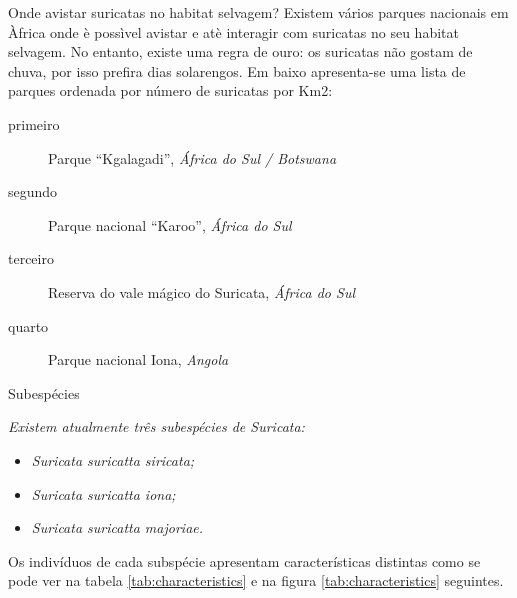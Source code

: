 \documentclass[11pt]{beamer}
\begin{document}
	\begin{frame}{Onde avistar suricatas no habitat selvagem?}
		Existem vários parques nacionais em Àfrica onde è possìvel avistar e
		atè interagir com suricatas no seu habitat selvagem. No entanto, existe
		uma regra de ouro: os suricatas não gostam de chuva, por isso prefira
		dias solarengos.
		Em baixo apresenta-se uma lista de parques ordenada por número de
		suricatas por Km2:

		\vskip 0.5cm

		\begin{description}
			\item[primeiro] Parque “Kgalagadi”, \textit{África do Sul / Botswana}
			\item[segundo] Parque nacional “Karoo”, \textit{África do Sul}
			\item[terceiro] Reserva do vale mágico do Suricata, \textit{África do Sul}
			\item[quarto] Parque nacional Iona, \textit{Angola}
		\end{description}
	\end{frame}


	\begin{frame}{Subespécies}
		
		\textit{Existem atualmente três subespécies de Suricata:}

		\begin{itemize}
			\item \textit{Suricata suricatta siricata;}
			\item \textit{Suricata suricatta iona;}
			\item \textit{Suricata suricatta majoriae.}
		\end{itemize}

		Os indivíduos de cada subspécie apresentam características
		distintas como se pode ver na tabela \ref{tab:characteristics} e na figura \ref{tab:characteristics} seguintes.

		\begin{table}[h!]
			\caption{ \textbf{
				Características diferenciadoras entre subespécies de Suricata - feita com framebox
				}}

				\label{tab:characteristics}

			\end{table}

	\end{frame}
\end{document}
